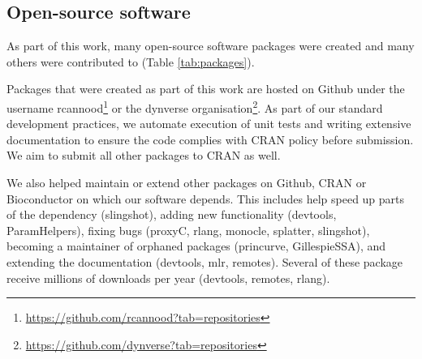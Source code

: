 \subsection{Open-source software}
As part of this work, many open-source software packages were created and many others were contributed to (Table \ref{tab:packages}). 

Packages that were created as part of this work are hosted on Github under the username rcannood\footnote{\url{https://github.com/rcannood?tab=repositories}} or the dynverse organisation\footnote{\url{https://github.com/dynverse?tab=repositories}}. As part of our standard development practices, we automate execution of unit tests and writing extensive documentation to ensure the code complies with CRAN policy before submission. We aim to submit all other packages to CRAN as well.

We also helped maintain or extend other packages on Github, CRAN or Bioconductor on which our software depends. This includes help speed up parts of the dependency (slingshot), adding new functionality (devtools, ParamHelpers), fixing bugs (proxyC, rlang, monocle, splatter, slingshot), becoming a maintainer of orphaned packages (princurve, GillespieSSA), and extending the documentation (devtools, mlr, remotes). Several of these package receive millions of downloads per year (devtools, remotes, rlang).

\newcommand{\cranpkg}[1]{\href{https://cran.r-project.org/package=#1}{#1}}
\newcommand{\biocpkg}[1]{\href{https://bioconductor.org/packages/#1}{#1}}
\newcommand{\biocpkgl}[2]{\href{https://bioconductor.org/packages/#1}{#2}}
\newcommand{\githubpkg}[2]{\href{https://github.com/#1/#2}{#2}}
\newcommand{\notavailable}{}

%
%
%
%
%


